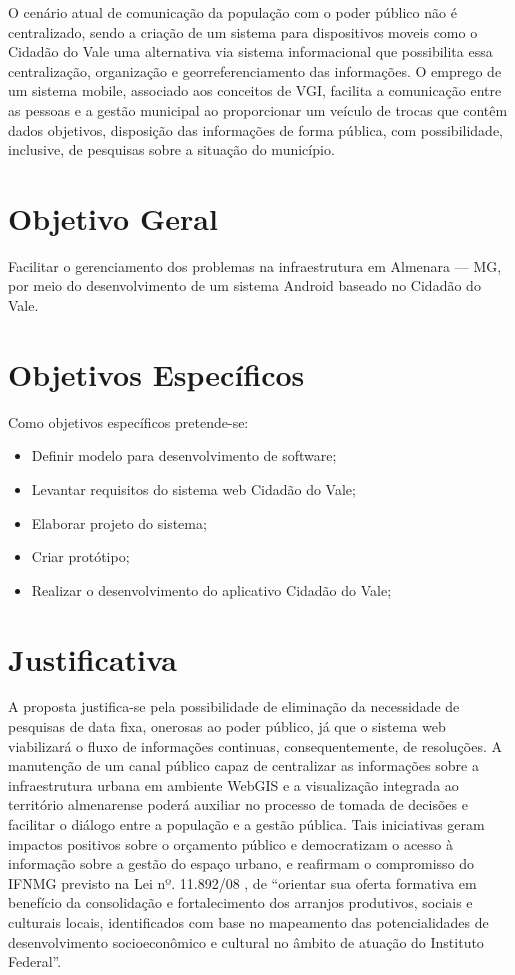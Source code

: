 O cenário atual de comunicação da população com o poder público não é centralizado, sendo a criação de um sistema para dispositivos moveis como o Cidadão do Vale uma alternativa via sistema informacional que possibilita essa centralização, organização e georreferenciamento das informações. O emprego de um sistema mobile, associado aos conceitos de VGI, facilita a comunicação entre as pessoas e a gestão municipal ao proporcionar um veículo de trocas que contêm dados objetivos, disposição das informações de forma pública, com possibilidade, inclusive, de pesquisas sobre a situação do município.


\section*{Objetivo Geral} 
Facilitar o gerenciamento dos problemas na infraestrutura em Almenara — MG, por meio do desenvolvimento de um sistema Android baseado no Cidadão do Vale.
	
\section*{Objetivos Específicos}
\begin{flushleft}
	Como objetivos específicos pretende-se:
\end{flushleft}

\begin{itemize}
	\item Definir modelo para desenvolvimento de software;
	\item Levantar requisitos do sistema web Cidadão do Vale;
	\item Elaborar projeto do sistema;
	\item Criar protótipo;
	\item Realizar o desenvolvimento do aplicativo Cidadão do Vale;
\end{itemize}

\section*{Justificativa}
A proposta justifica-se pela possibilidade de eliminação da necessidade de pesquisas de data fixa, onerosas ao poder público, já que o sistema web viabilizará o fluxo de informações continuas, consequentemente, de resoluções. A manutenção de um canal público capaz de centralizar as informações sobre a infraestrutura urbana em ambiente WebGIS e a visualização integrada ao território almenarense poderá auxiliar no processo de tomada de decisões e facilitar o diálogo entre a população e a gestão pública. Tais iniciativas geram impactos positivos sobre o orçamento público e democratizam o acesso à informação sobre a gestão do espaço urbano, e reafirmam o compromisso do IFNMG previsto na Lei nº. 11.892/08 , de “orientar sua oferta formativa em benefício da consolidação e fortalecimento dos arranjos produtivos, sociais e culturais locais, identificados com base no mapeamento das potencialidades de desenvolvimento socioeconômico e cultural no âmbito de atuação do Instituto Federal”.